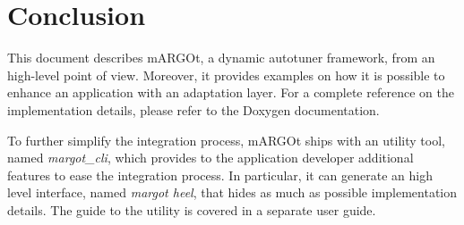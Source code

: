 \section{Conclusion}

This document describes mARGOt, a dynamic autotuner framework, from an high-level point of view.
Moreover, it provides examples on how it is possible to enhance an application with an adaptation layer.
For a complete reference on the implementation details, please refer to the Doxygen documentation.

To further simplify the integration process, mARGOt ships with an utility tool, named \textit{margot\_cli}, which provides to the application developer additional features to ease the integration process.
In particular, it can generate an high level interface, named \textit{margot heel}, that hides as much as possible implementation details.
The guide to the utility is covered in a separate user guide.